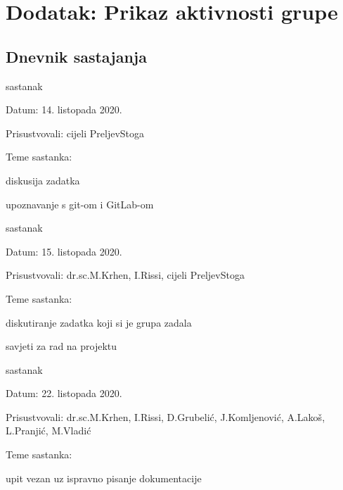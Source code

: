 \chapter*{Dodatak: Prikaz aktivnosti grupe}
		
		\section*{Dnevnik sastajanja}
		
		\begin{packed_enum}
			\item  sastanak
			\item[] \begin{packed_item}
				\item Datum: 14. listopada 2020.
				\item Prisustvovali: cijeli PreljevStoga
				\item Teme sastanka:
				\begin{packed_item}
					\item  diskusija zadatka
					\item  upoznavanje s git-om i GitLab-om
				\end{packed_item}
			\end{packed_item}
			
			\item  sastanak
			\item[] \begin{packed_item}
				\item Datum: 15. listopada 2020.
				\item Prisustvovali: dr.sc.M.Krhen, I.Rissi, cijeli PreljevStoga
				\item Teme sastanka:
				\begin{packed_item}
					\item  diskutiranje zadatka koji si je grupa zadala
					\item  savjeti za rad na projektu
				\end{packed_item}
			\end{packed_item}
			
			\item  sastanak
			\item[] \begin{packed_item}
				\item Datum: 22. listopada 2020.
				\item Prisustvovali: dr.sc.M.Krhen, I.Rissi, D.Grubelić, J.Komljenović, A.Lakoš, L.Pranjić, M.Vladić
				\item Teme sastanka:
				\begin{packed_item}
					\item  upit vezan uz ispravno pisanje dokumentacije
				\end{packed_item}
			\end{packed_item}
			

\end{packed_enum}

